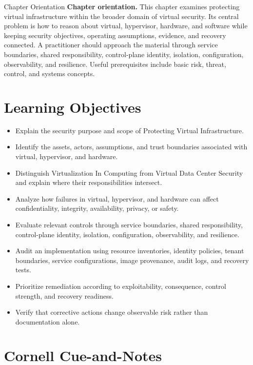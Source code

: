 \documentclass[11pt,letterpaper]{article}
\title{\CornellDocumentTitle}
\author{}
\date{}
\begin{document}
\maketitle
\begin{CornellOverviewBox}{Chapter Orientation}
\textbf{Chapter orientation.} This chapter examines protecting virtual infrastructure within the broader domain of virtual security. Its central problem is how to reason about virtual, hypervisor, hardware, and software while keeping security objectives, operating assumptions, evidence, and recovery connected. A practitioner should approach the material through service boundaries, shared responsibility, control-plane identity, isolation, configuration, observability, and resilience. Useful prerequisites include basic risk, threat, control, and systems concepts.
\end{CornellOverviewBox}
\section*{Learning Objectives}
\begin{itemize}
\item Explain the security purpose and scope of Protecting Virtual Infrastructure.
\item Identify the assets, actors, assumptions, and trust boundaries associated with virtual, hypervisor, and hardware.
\item Distinguish Virtualization In Computing from Virtual Data Center Security and explain where their responsibilities intersect.
\item Analyze how failures in virtual, hypervisor, and hardware can affect confidentiality, integrity, availability, privacy, or safety.
\item Evaluate relevant controls through service boundaries, shared responsibility, control-plane identity, isolation, configuration, observability, and resilience.
\item Audit an implementation using resource inventories, identity policies, tenant boundaries, service configurations, image provenance, audit logs, and recovery tests.
\item Prioritize remediation according to exploitability, consequence, control strength, and recovery readiness.
\item Verify that corrective actions change observable risk rather than documentation alone.
\end{itemize}
\section*{Cornell Cue-and-Notes}
\end{document}

